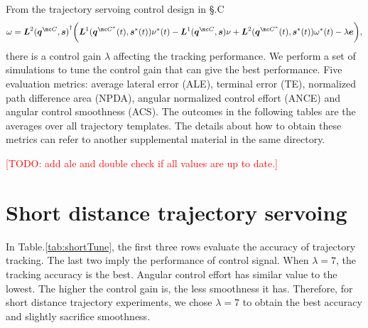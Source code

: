 \documentclass[11pt]{article}
\newcommand{\TODO}[1]{\textcolor{red}{[TODO: #1]}}
\begin{document}
\newcommand{\RomanNumeralCaps}[1]
    {\MakeUppercase{\romannumeral #1}}

\newcommand{\imJacV}{\boldsymbol{L}}
\newcommand{\pointSetV}{\boldsymbol{q}}
\newcommand{\featSetV}{\boldsymbol{s}}
\newcommand{\featSetDV}{\boldsymbol{s}^*}
\newcommand{\error}{\boldsymbol{e}}

From the trajectory servoing control design in \S \RomanNumeralCaps{2}.C
\begin{equation} \label{eq:IBVStrajTrack}
  \omega = {\imJacV^2(\pointSetV^{\mc C},\featSetV)}^\dagger
    \bigg( \imJacV^1(\pointSetV^{\mc C^*}(t),\featSetDV(t)) \nu^* {(t)} 
          -\imJacV^1(\pointSetV^{\mc C},\featSetV) \nu
      + \imJacV^2(\pointSetV^{\mc C^*}(t),\featSetDV(t)) \omega^* {(t)}
      - \lambda \error \bigg),
\end{equation}
there is a control gain $\lambda$ affecting the tracking performance. 
We perform a set of simulations to tune the control gain that can give the 
best performance.
Five evaluation metrics: average lateral error (ALE), terminal error (TE), 
normalized path difference area (NPDA), 
angular normalized control effort (ANCE) and angular control smoothness (ACS).
The outcomes in the following tables are the averages over 
all trajectory templates.
The details about how to obtain these metrics can refer to another supplemental 
material in the same directory.

\TODO{add ale and double check if all values are up to date.}

\section{Short distance trajectory servoing}\label{sec:short}

In Table.\ref{tab:shortTune}, the first three rows evaluate the accuracy of 
trajectory tracking. The last two imply the performance of control signal.
When $\lambda=7$, the tracking accuracy is the best. Angular control effort 
has similar value to the lowest. The higher the control gain is, the less 
smoothness it has.
Therefore, for short distance trajectory experiments, 
we chose $\lambda=7$ to obtain the best accuracy 
and slightly sacrifice smoothness.
\end{document}
